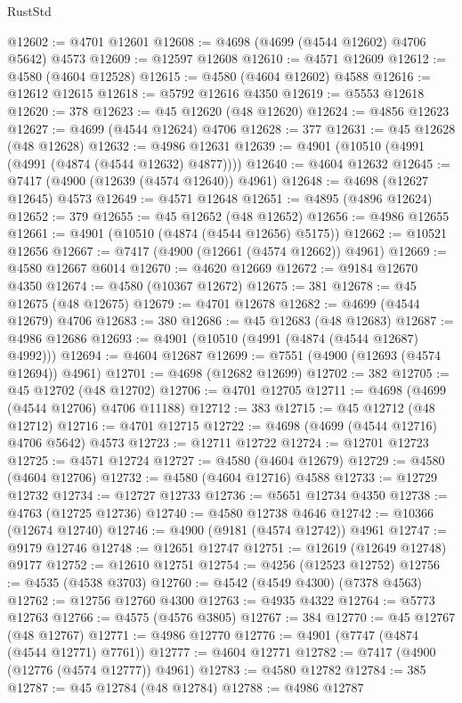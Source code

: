 \begin{lexlean}{RustStd}
\begin{coremodule}
@12602 := @4701 @12601
@12608 := @4698 (@4699 (@4544 @12602) @4706 @5642) @4573
@12609 := @12597 @12608
@12610 := @4571 @12609
@12612 := @4580 (@4604 @12528)
@12615 := @4580 (@4604 @12602) @4588
@12616 := @12612 @12615
@12618 := @5792 @12616 @4350
@12619 := @5553 @12618
@12620 := 378
@12623 := @45 @12620 (@48 @12620)
@12624 := @4856 @12623
@12627 := @4699 (@4544 @12624) @4706
@12628 := 377
@12631 := @45 @12628 (@48 @12628)
@12632 := @4986 @12631
@12639 := @4901 (@10510 (@4991 (@4991 (@4874 (@4544 @12632) @4877))))
@12640 := @4604 @12632
@12645 := @7417 (@4900 (@12639 (@4574 @12640)) @4961)
@12648 := @4698 (@12627 @12645) @4573
@12649 := @4571 @12648
@12651 := @4895 (@4896 @12624)
@12652 := 379
@12655 := @45 @12652 (@48 @12652)
@12656 := @4986 @12655
@12661 := @4901 (@10510 (@4874 (@4544 @12656) @5175))
@12662 := @10521 @12656
@12667 := @7417 (@4900 (@12661 (@4574 @12662)) @4961)
@12669 := @4580 @12667 @6014
@12670 := @4620 @12669
@12672 := @9184 @12670 @4350
@12674 := @4580 (@10367 @12672)
@12675 := 381
@12678 := @45 @12675 (@48 @12675)
@12679 := @4701 @12678
@12682 := @4699 (@4544 @12679) @4706
@12683 := 380
@12686 := @45 @12683 (@48 @12683)
@12687 := @4986 @12686
@12693 := @4901 (@10510 (@4991 (@4874 (@4544 @12687) @4992)))
@12694 := @4604 @12687
@12699 := @7551 (@4900 (@12693 (@4574 @12694)) @4961)
@12701 := @4698 (@12682 @12699)
@12702 := 382
@12705 := @45 @12702 (@48 @12702)
@12706 := @4701 @12705
@12711 := @4698 (@4699 (@4544 @12706) @4706 @11188)
@12712 := 383
@12715 := @45 @12712 (@48 @12712)
@12716 := @4701 @12715
@12722 := @4698 (@4699 (@4544 @12716) @4706 @5642) @4573
@12723 := @12711 @12722
@12724 := @12701 @12723
@12725 := @4571 @12724
@12727 := @4580 (@4604 @12679)
@12729 := @4580 (@4604 @12706)
@12732 := @4580 (@4604 @12716) @4588
@12733 := @12729 @12732
@12734 := @12727 @12733
@12736 := @5651 @12734 @4350
@12738 := @4763 (@12725 @12736)
@12740 := @4580 @12738 @4646
@12742 := @10366 (@12674 @12740)
@12746 := @4900 (@9181 (@4574 @12742)) @4961
@12747 := @9179 @12746
@12748 := @12651 @12747
@12751 := @12619 (@12649 @12748) @9177
@12752 := @12610 @12751
@12754 := @4256 (@12523 @12752)
@12756 := @4535 (@4538 @3703)
@12760 := @4542 (@4549 @4300) (@7378 @4563)
@12762 := @12756 @12760 @4300
@12763 := @4935 @4322
@12764 := @5773 @12763
@12766 := @4575 (@4576 @3805)
@12767 := 384
@12770 := @45 @12767 (@48 @12767)
@12771 := @4986 @12770
@12776 := @4901 (@7747 (@4874 (@4544 @12771) @7761))
@12777 := @4604 @12771
@12782 := @7417 (@4900 (@12776 (@4574 @12777)) @4961)
@12783 := @4580 @12782
@12784 := 385
@12787 := @45 @12784 (@48 @12784)
@12788 := @4986 @12787

\end{coremodule}
\end{lexlean}
